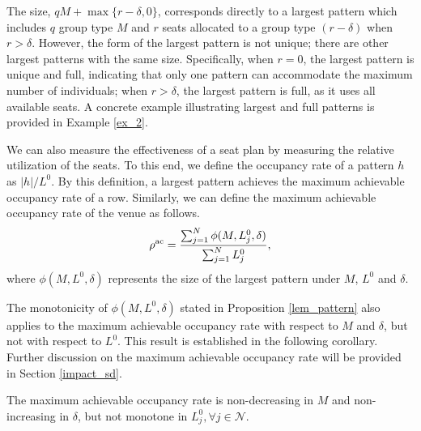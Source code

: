 The size, $qM + \max\{r-\delta, 0\}$, corresponds directly to a largest pattern which includes $q$ group type $M$ and $r$ seats allocated to a group type $(r-\delta)$ when $r>\delta$. However, the form of the largest pattern is not unique; there are other largest patterns with the same size. 
Specifically, when $r = 0$, the largest pattern is unique and full, indicating that only one pattern can accommodate the maximum number of individuals; when $r > \delta$, the largest pattern is full, as it uses all available seats. A concrete example illustrating largest and full patterns is provided in Example \ref{ex_2}. 

We can also measure the effectiveness of a seat plan by measuring the relative utilization of the seats. To this end, we define the occupancy rate of a pattern $h$ as $|h|/L^0$. By this definition, a largest pattern achieves the maximum achievable occupancy rate of a row. Similarly, we can define the maximum achievable occupancy rate of the venue as follows. 
$$\rho^{\textup{ac}} =  \frac{\sum_{j =1}^{N}\phi(M, L_{j}^{0}, \delta)}{\sum_{j =1}^{N} L_{j}^{0}},$$
where $\phi(M, L^{0}, \delta)$ represents the size of the largest pattern under $M$, $L^{0}$ and $\delta$.

The monotonicity of $\phi(M, L^{0}, \delta)$ stated in Proposition \ref{lem_pattern} also applies to the maximum achievable occupancy rate with respect to $M$ and $\delta$, but not with respect to $L^{0}$. This result is established in the following corollary. 
Further discussion on the maximum achievable occupancy rate will be provided in Section \ref{impact_sd}.


\begin{corollary}\label{maximum_phi}
The maximum achievable occupancy rate is non-decreasing in $M$ and non-increasing in $\delta$, but not monotone in $L_{j}^{0}, \forall j \in \mathcal{N}$.
\end{corollary}

 

